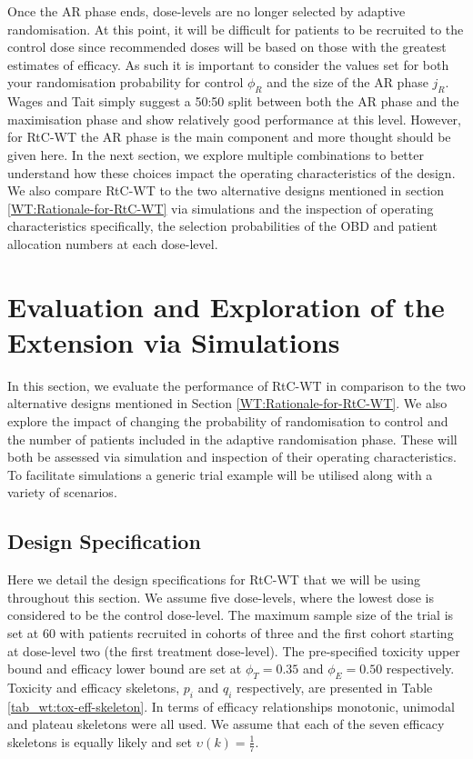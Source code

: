 Once the AR phase ends, dose-levels are no longer selected by adaptive randomisation. At this point, it will be difficult for patients to be recruited to the control dose since recommended doses will be based on those with the greatest estimates of efficacy. As such it is important to consider the values set for both your randomisation probability for control $\phi_R$ and the size of the AR phase $j_R$. Wages and Tait simply suggest a 50:50 split between both the AR phase and the maximisation phase and show relatively good performance at this level. However, for RtC-WT the AR phase is the main component and more thought should be given here. In the next section, we explore multiple combinations to better understand how these choices impact the operating characteristics of the design. We also compare RtC-WT to the two alternative designs mentioned in section  \ref{WT:Rationale-for-RtC-WT} via simulations and the inspection of operating characteristics specifically, the selection probabilities of the OBD and patient allocation numbers at each dose-level. 

\section{Evaluation and Exploration of the Extension via Simulations}
\label{WT:Evaluation-of-the-Extension}

In this section, we evaluate the performance of RtC-WT in comparison to the two alternative designs mentioned in Section \ref{WT:Rationale-for-RtC-WT}. We also explore the impact of changing the probability of randomisation to control and the number of patients included in the adaptive randomisation phase. These will both be assessed via simulation and inspection of their operating characteristics. To facilitate simulations a generic trial example will be utilised along with a variety of scenarios. 

\subsection{Design Specification}
\label{WT:Design-Spec}

Here we detail the design specifications for RtC-WT that we will be using throughout this section. We assume five dose-levels, where the lowest dose is considered to be the control dose-level. The maximum sample size of the trial is set at 60 with patients recruited in cohorts of three and the first cohort starting at dose-level two (the first treatment dose-level). The pre-specified toxicity upper bound and efficacy lower bound are set at $\phi_T = 0.35$ and $\phi_E = 0.50$ respectively. Toxicity and efficacy skeletons, $p_i$ and $q_i$ respectively, are presented in Table \ref{tab_wt:tox-eff-skeleton}. In terms of efficacy relationships monotonic, unimodal and plateau skeletons were all used. We assume that each of the seven efficacy skeletons is equally likely and set $\upsilon(k) = \frac{1}{7}$. 


